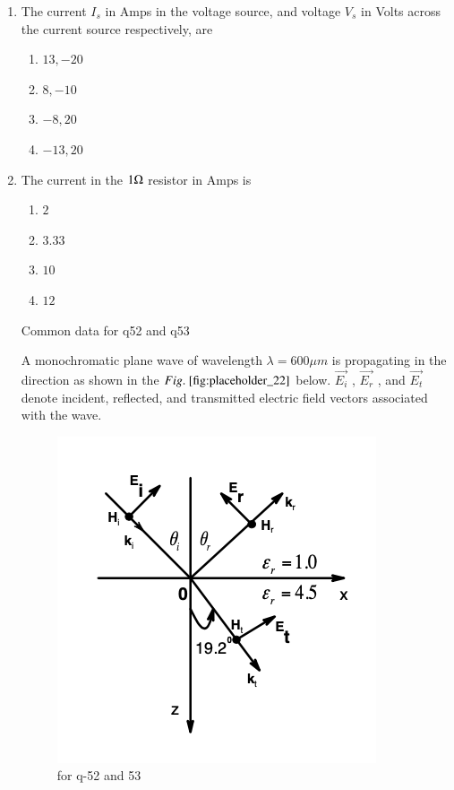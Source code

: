 \documentclass[journal,12pt,onecolumn]{IEEEtran}
\theoremstyle{remark}
\begin{document}
\begin{enumerate}
\item The current $I_s$ in Amps in the voltage source, and voltage $V_s$ in Volts across the current source respectively, are
\begin{multicols}{4}
\begin{enumerate}
\item $13, -20$
\item $8, -10$
\item $-8, 20$
\item $-13, 20$
\end{enumerate}
\end{multicols}
\hfill {}



\item The current in the $1 \ohm$ resistor in Amps is
\begin{multicols}{4}
\begin{enumerate}
\item $2$
\item $3.33$
\item $10$
\item $12$
\end{enumerate}
\end{multicols}
\hfill {}

Common data for q52 and q53

A monochromatic plane wave of wavelength $\lambda = 600\mu m$ is propagating in the direction as shown in the $\figref{fig:placeholder_22}$ below. $\vec{E_i}$ , $\vec{E_r}$ , and $\vec{E_t}$ denote incident, reflected, and transmitted electric field vectors associated with the wave.
\begin{figure}[H]
    \centering
    \includegraphics[width=0.5\columnwidth]{figs/fig_22.png}
    \caption{for q-52 and 53}
    \label{fig:placeholder_22}
\end{figure}


\end{enumerate}
\end{document}
